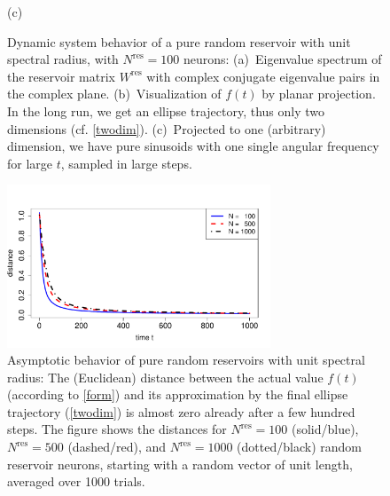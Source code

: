 \documentclass[twoside,11pt]{article}
\theoremstyle{definition}
\begin{document}
\begin{figure}[t]
    (c) 
  \caption{Dynamic system behavior of a pure random reservoir with unit spectral
	radius, with $N^\mathrm{res} = 100$ neurons:
    (a)~Eigenvalue spectrum of the reservoir matrix $W^\mathrm{res}$ with
	complex conjugate eigenvalue pairs in the complex plane.
    (b)~Visualization of $f(t)$ by planar projection. In the long run, we get an
	ellipse trajectory, thus only two dimensions (cf. \cref{twodim}).
    (c)~Projected to one (arbitrary) dimension, we have pure sinusoids with one
	single angular frequency for large $t$, sampled in large steps.}
  \label{ell}
\end{figure}

\begin{figure}
 \centering
 \includegraphics[width=0.7\textwidth]{fig/asymptot0} %
  \caption{Asymptotic behavior of pure random reservoirs with unit spectral radius:
	The (Euclidean) distance between the actual value $f(t)$
	(according to \cref{form}) and its approximation by the final ellipse
	trajectory (\cref{twodim}) is almost zero already after a few hundred
	steps. The figure shows the distances for $N^\mathrm{res}=100$ (solid/blue), $N^\mathrm{res}=500$
	(dashed/red), and $N^\mathrm{res}=1000$ (dotted/black) random reservoir neurons,
	starting with a random vector of unit length, averaged over 1000 trials.}
  \label{asymptot}
\end{figure}
\end{document}
